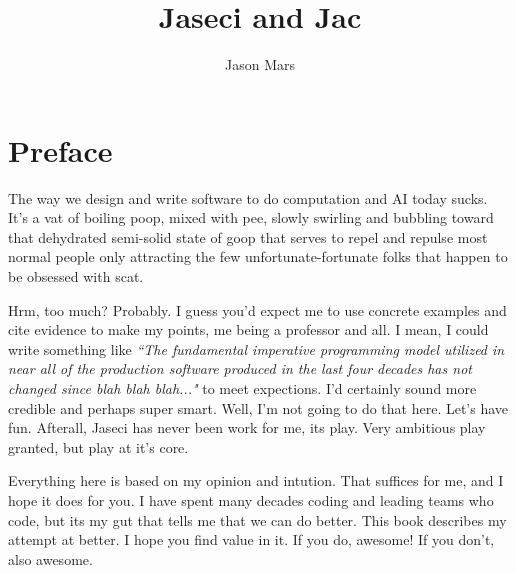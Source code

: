 \documentclass{book}
\title{Jaseci and Jac}
\author{Jason Mars}
\begin{document}


\cleardoublepage %
\setcounter{secnumdepth}{3} %
\tableofcontents
\pagebreak
\printglossary[title=Terms Used, toctitle=List of Terms]
\printglossary[type=technical, title=Technical Terms Used, toctitle=List of Technical Terms]


\chapter*{Preface}

The way we design and write software to do computation and AI today sucks. It's a vat of boiling poop, mixed with pee, slowly swirling and bubbling toward that dehydrated semi-solid state of goop that serves to repel and repulse most normal people only attracting the few unfortunate-fortunate folks that happen to be obsessed with \gls{scat}.
\par
Hrm, too much? Probably. I guess you'd expect me to use concrete examples and cite evidence to make my points, me being a professor and all. I mean, I could write something like \textit{``The fundamental imperative programming model utilized in near all of the production software produced in the last four decades has not changed since blah blah blah..."} to meet expections. I'd certainly sound more credible and perhaps super smart. Well, I'm not going to do that here. Let's have fun. Afterall, Jaseci has never been work for me, its play. Very ambitious play granted, but play at it's core.
\par
Everything here is based on my opinion and intution. That suffices for me, and I hope it does for you. I have spent many decades coding and leading teams who code, but its my gut that tells me that we can do better. This book describes my attempt at better. I hope you find value in it. If you do, awesome! If you don't, also awesome.
\end{document}

